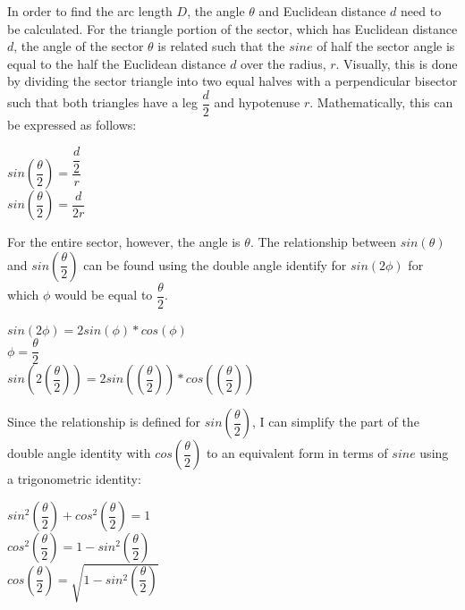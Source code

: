 \documentclass[a4paper]{article}
\begin{document}
In order to find the arc length $D$, the angle $\theta$ and Euclidean distance $d$ need to be calculated. For the triangle portion of the sector, which has Euclidean distance $d$, the angle of the sector $\theta$ is related such that the $sine$ of half the sector angle is equal to the half the Euclidean distance $d$ over the radius, $r$. Visually, this is done by dividing the sector triangle into two equal halves with a perpendicular bisector such that both triangles have a leg $\dfrac{d}{2}$ and hypotenuse $r$. Mathematically, this can be expressed as follows: 


\begin{center}
\textbf{$sin\left(\dfrac{\theta}{2	}\right) = \dfrac{\dfrac{d}{2}}{r}$}\\
\medskip
\textbf{$sin\left(\dfrac{\theta}{2	}\right) = \dfrac{d}{2r}$}\\
\end{center}

For the entire sector, however, the angle is $\theta$. The relationship between $sin(\theta)$ and $sin\left(\dfrac{\theta}{2}\right)$ can be found using the double angle identify for $sin(2\phi)$ for which $\phi$ would be equal to $\dfrac{\theta}{2}$.

\begin{center}
\textbf{$sin(2\phi) = 2sin(\phi)*cos(\phi)$}\\
\medskip
\textbf{$\phi = \dfrac{\theta}{2}$}\\
\medskip
\textbf{$sin(2\left(\dfrac{\theta}{2}\right)) = 2sin(\left(\dfrac{\theta}{2}\right))*cos(\left(\dfrac{\theta}{2}\right))$}\\
\end{center}

Since the relationship is defined for $sin\left(\dfrac{\theta}{2	}\right)$, I can simplify the part of the double angle identity with $cos\left(\dfrac{\theta}{2	}\right)$ to an equivalent form in terms of $sine$ using a trigonometric identity:

\begin{center}
\textbf{$sin^2\left(\dfrac{\theta}{2}\right) + cos^2\left(\dfrac{\theta}{2	}\right) = 1$}\\
\medskip
\textbf{$cos^2\left(\dfrac{\theta}{2	}\right) = 1-sin^2\left(\dfrac{\theta}{2}\right)$}\\
\medskip
\textbf{$cos\left(\dfrac{\theta}{2	}\right) = \sqrt{1-sin^2\left(\dfrac{\theta}{2}\right)}$}\\
\end{center}
\end{document}
